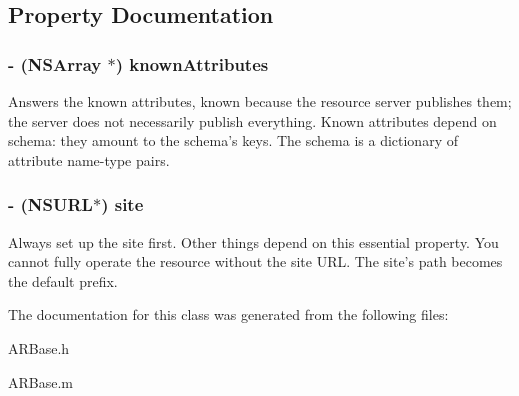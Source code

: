 \subsection{\-Property \-Documentation}
\hypertarget{a00001_a56a8d73d2c0c3792d09a05b1f9588540}{
\subsubsection[{known\-Attributes}]{\setlength{\rightskip}{0pt plus 5cm}-\/ (\-N\-S\-Array $\ast$) known\-Attributes}}
\label{a00001_a56a8d73d2c0c3792d09a05b1f9588540}
\-Answers the known attributes, known because the resource server publishes them; the server does not necessarily publish everything. \-Known attributes depend on schema\-: they amount to the schema's keys. \-The schema is a dictionary of attribute name-\/type pairs. \hypertarget{a00001_a41acdb2fabc743190d933890aa6e0f33}{
\subsubsection[{site}]{\setlength{\rightskip}{0pt plus 5cm}-\/ (\-N\-S\-U\-R\-L$\ast$) site}}
\label{a00001_a41acdb2fabc743190d933890aa6e0f33}
\-Always set up the site first. \-Other things depend on this essential property. \-You cannot fully operate the resource without the site \-U\-R\-L. \-The site's path becomes the default prefix. 

\-The documentation for this class was generated from the following files\-:\begin{DoxyCompactItemize}
\item 
\-A\-R\-Base.\-h\item 
\-A\-R\-Base.\-m\end{DoxyCompactItemize}
